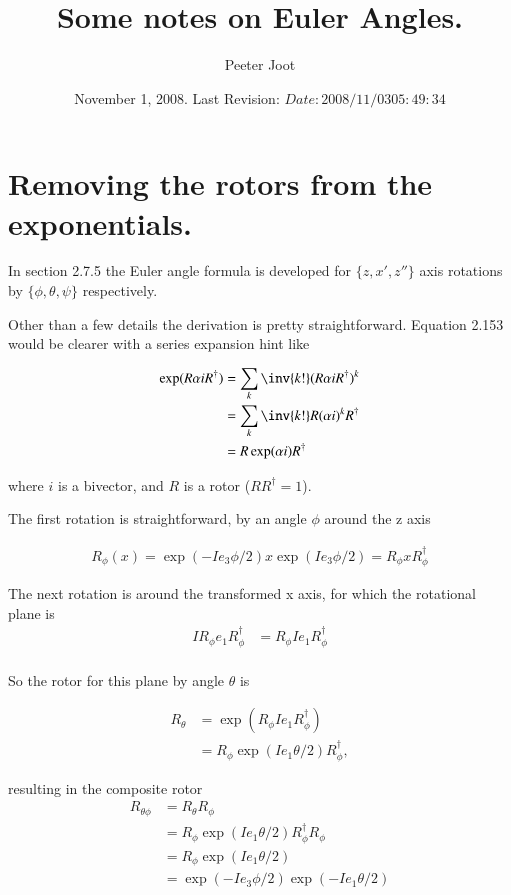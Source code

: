 \documentclass{article}
\title{Some notes on Euler Angles.}
\author{Peeter Joot}
\date{ November 1, 2008. Last Revision: $Date: 2008/11/03 05:49:34 $ }
\begin{document}
\maketitle{}
\tableofcontents

\section{ Removing the rotors from the exponentials. }

In \cite{doran2003gap} section 2.7.5 the Euler angle formula is 
developed for $\{z,x',z''\}$ axis rotations by $\{\phi, \theta, \psi\}$
respectively.

Other than a few details the derivation is pretty straightforward.  Equation
2.153 would be clearer with a series expansion hint like

\begin{align*}
\exp(R \alpha i R^\dagger) 
&= \sum_k \inv{k!} (R \alpha i R^\dagger)^k \\
&= \sum_k \inv{k!} R (\alpha i)^k R^\dagger \\
&= R \exp(\alpha i) R^\dagger
\end{align*}

where $i$ is a bivector, and $R$ is a rotor ($RR^\dagger = 1$).

The first rotation is straightforward, by an angle $\phi$ around the z axis

\begin{align*}
R_\phi(x) = \exp(-Ie_3 \phi/2) x \exp(Ie_3 \phi/2) = R_\phi x R_\phi^\dagger
\end{align*}

The next rotation is around the transformed x axis, for which the rotational plane is
\begin{align*}
I R_\phi e_1 R_\phi^\dagger 
&= R_\phi I e_1 R_\phi^\dagger  \\
\end{align*}

So the rotor for this plane by angle $\theta$ is

\begin{align*}
R_\theta 
&= \exp( R_\phi I e_1 R_\phi^\dagger ) \\
&= R_\phi \exp( I e_1 \theta/2) R_\phi^\dagger,
\end{align*}

resulting in the composite rotor
\begin{align*}
R_{\theta\phi}
&=
R_\theta 
R_\phi \\
&= R_\phi \exp( I e_1 \theta/2) R_\phi^\dagger R_\phi \\
&= R_\phi \exp( I e_1 \theta/2) \\
&= 
\exp{( -I e_3 \phi/2 )}
\exp( -I e_1 \theta/2 ) \\
\end{align*}
\end{document}

